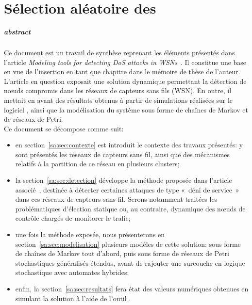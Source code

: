 \chapter{Sélection aléatoire des \cns}\label{chap:sa}

\renewcommand\chapterpath{Main/SelecAleatoire}
\renewcommand\chapterfig{Main/SelecAleatoire/Figures}

\paragraph{abstract}
Ce document est un travail de synthèse reprenant les éléments présentés dans l'article \textit{Modeling tools for detecting DoS attacks in WSNs}~\cite{BMM13}.
Il constitue une base en vue de l'insertion en tant que chapitre dans le mémoire de thèse de l'auteur.\\

L'article en question exposait une solution dynamique permettant la détection de nœuds compromis dans les réseaux de capteurs sans fils (WSN).
En outre, il mettait en avant des résultats obtenus à partir de simulations réalisées sur le logiciel \nsii, ainsi que la modélisation du système sous forme de chaînes de Markov et de réseaux de Petri.\\

Ce document se décompose comme suit:
\begin{itemize}
	\item en section~\ref{sa:sec:contexte} est introduit le contexte des travaux présentés: y sont présentés les réseaux de capteurs sans fil, ainsi que des mécanismes relatifs à la partition de ce réseau en plusieurs clusters;
	\item la section~\ref{sa:sec:detection} développe la méthode proposée dans l'article associé~\cite{BMM13}, destinée à détecter certaines attaques de type «~déni de service~» dans ces réseaux de capteurs sans fil. Serons notamment traitées les problématiques d'élection statique ou, au contraire, dynamique des nœuds de contrôle chargés de monitorer le trafic;
	\item une fois la méthode exposée, nous présenterons en section~\ref{sa:sec:modelisation} plusieurs modèles de cette solution: sous forme de chaînes de Markov tout d'abord, puis sous forme de réseaux de Petri stochastiques généralisés étendus, avant de rajouter une surcouche en logique stochastique avec automates hybrides;
	\item enfin, la section~\ref{sa:sec:resultats} fera état des valeurs numériques obtenues en simulant la solution à l'aide de l'outil \nsii.
\end{itemize}








